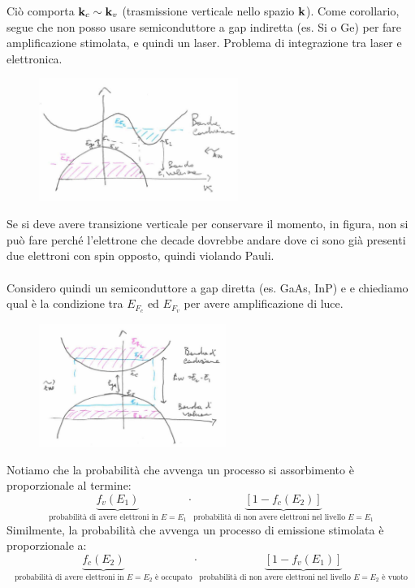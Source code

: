 Ciò comporta $\mathbf{k}_c \sim \mathbf{k}_v$ (trasmissione verticale nello spazio $\mathbf{k}$).
Come corollario, segue che non posso usare semiconduttore a gap indiretta (es. Si o Ge) per fare amplificazione stimolata, e quindi un laser. Problema di integrazione tra laser e elettronica.
\begin{figure}[H]
\centering
\includegraphics[height=4cm]{images/laser_80_5}
\end{figure}
\noindent
Se si deve avere transizione verticale per conservare il momento, in figura, non si può fare perché l'elettrone che decade dovrebbe andare dove ci sono già presenti due elettroni con spin opposto, quindi violando Pauli.\\
\\
Considero quindi un semiconduttore a gap diretta (es. GaAs, InP) e e chiediamo qual è la condizione tra $E_{F_c}$ ed $E_{F_v}$ per avere amplificazione di luce.
\begin{figure}[H]
\centering
\includegraphics[height=4cm]{images/laser_80_6}
\end{figure}
\noindent
Notiamo che la probabilità che avvenga un processo si assorbimento è proporzionale al termine:
\begin{equation*}
\underbrace{f_v(E_1)}_\text{probabilità di avere elettroni in $E=E_1$} \cdot \underbrace{[1 - f_c(E_2)]}_\text{probabilità di non avere elettroni nel livello $E=E_1$}
\end{equation*}
Similmente, la probabilità che avvenga un processo di emissione stimolata è proporzionale a:
\begin{equation*}
\underbrace{f_c(E_2)}_\text{probabilità di avere elettroni in $E=E_2$ è occupato} \cdot \underbrace{[1 - f_v(E_1)]}_\text{probabilità di non avere elettroni nel livello $E=E_2$ è vuoto}
\end{equation*}

